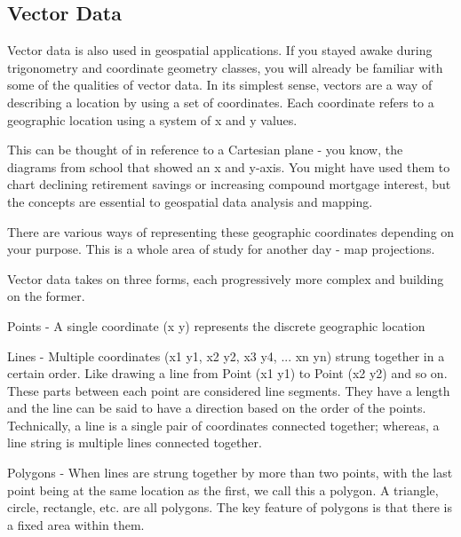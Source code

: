 \subsection{Vector Data}
Vector data is also used in geospatial applications. If you stayed awake during trigonometry and coordinate geometry classes, you will already be familiar with some of the qualities of vector data. In its simplest sense, vectors are a way of describing a location by using a set of coordinates. Each coordinate refers to a geographic location using a system of x and y values.

This can be thought of in reference to a Cartesian plane - you know, the diagrams from school that showed an x and y-axis. You might have used them to chart declining retirement savings or increasing compound mortgage interest, but the concepts are essential to geospatial data analysis and mapping.

There are various ways of representing these geographic coordinates depending on your purpose. This is a whole area of study for another day - map projections.

Vector data takes on three forms, each progressively more complex and building on the former.
\begin{compactenum}
\item Points - A single coordinate (x y) represents the discrete geographic location
\item Lines - Multiple coordinates (x1 y1, x2 y2, x3 y4, ... xn yn) strung together in a certain order. Like drawing a line from Point (x1 y1) to Point (x2 y2) and so on. These parts between each point are considered line segments. They have a length and the line can be said to have a direction based on the order of the points. Technically, a line is a single pair of coordinates connected together; whereas, a line string is multiple lines connected together.
\item Polygons - When lines are strung together by more than two points, with the last point being at the same location as the first, we call this a polygon. A triangle, circle, rectangle, etc. are all polygons. The key feature of polygons is that there is a fixed area within them.
\end{compactenum}

